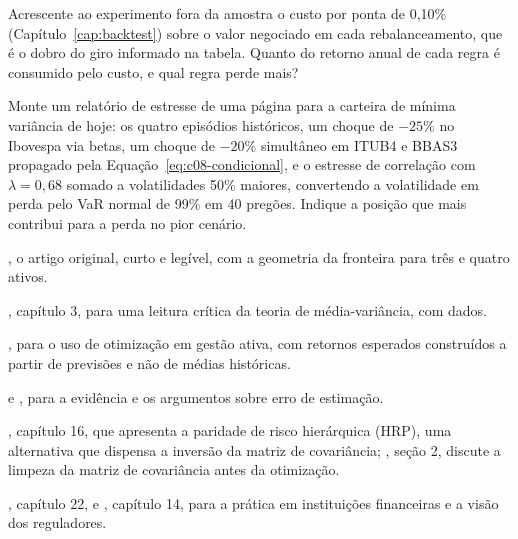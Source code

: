 \begin{exercicios}
  \item {} Acrescente ao experimento fora da amostra o custo por ponta de 0,10\% (Capítulo~\ref{cap:backtest}) sobre o valor negociado em cada rebalanceamento, que é o dobro do giro informado na tabela. Quanto do retorno anual de cada regra é consumido pelo custo, e qual regra perde mais?
  \item {} Monte um relatório de estresse de uma página para a carteira de mínima variância de hoje: os quatro episódios históricos, um choque de $-25\%$ no Ibovespa via betas, um choque de $-20\%$ simultâneo em ITUB4 e BBAS3 propagado pela Equação~\eqref{eq:c08-condicional}, e o estresse de correlação com $\lambda = 0,68$ somado a volatilidades 50\% maiores, convertendo a volatilidade em perda pelo VaR normal de 99\% em 40 pregões. Indique a posição que mais contribui para a perda no pior cenário.
\end{exercicios}

\begin{leituras}
  \item \citet{markowitz1952}, o artigo original, curto e legível, com a geometria da fronteira para três e quatro ativos.
  \item \citet{ang2014}, capítulo 3, para uma leitura crítica da teoria de média-variância, com dados.
  \item \citet{grinold2000}, para o uso de otimização em gestão ativa, com retornos esperados construídos a partir de previsões e não de médias históricas.
  \item \citet{demiguel2009} e \citet{michaud1989}, para a evidência e os argumentos sobre erro de estimação.
  \item \citet{lopezdeprado2018}, capítulo 16, que apresenta a paridade de risco hierárquica (HRP), uma alternativa que dispensa a inversão da matriz de covariância; \citet{lopezdeprado2020}, seção 2, discute a limpeza da matriz de covariância antes da otimização.
  \item \citet{hull2018}, capítulo 22, e \citet{jorion2007}, capítulo 14, para a prática em instituições financeiras e a visão dos reguladores.
\end{leituras}
